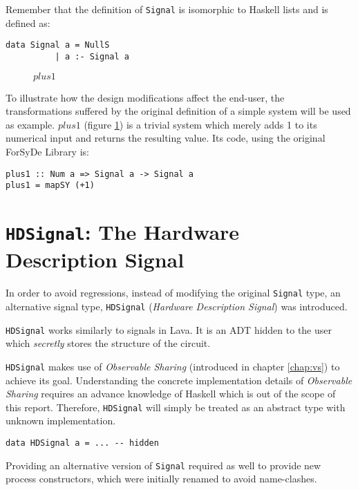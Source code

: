Remember that the definition of \texttt{Signal} is isomorphic to
Haskell lists and is defined as:

\begin{lstlisting}
data Signal a = NullS
	      | a :- Signal a 
\end{lstlisting} 


\begin{figure}
\centering

  \caption{$\mathit{plus1}$}
  \label{fig:plus1}
\end{figure}


To illustrate how the design modifications affect the end-user, the
transformations suffered by the original definition of a simple system
will be used as example. $\mathit{plus1}$ (figure \ref{fig:plus1}) is
a trivial system which merely adds 1 to its numerical input and returns
the resulting value.  Its code, using the original ForSyDe Library is:

\begin{lstlisting}
plus1 :: Num a => Signal a -> Signal a
plus1 = mapSY (+1)
\end{lstlisting}



\section{\texttt{HDSignal}: The Hardware Description Signal}
\label{sec:hdsignal}

In order to avoid regressions, instead of modifying the original
\texttt{Signal} type, an alternative signal type, \texttt{HDSignal}
(\textit{Hardware Description Signal}) was introduced.

\texttt{HDSignal} works similarly to signals in Lava. It is an ADT
hidden to the user which \textit{secretly} stores the structure of
the circuit.

\texttt{HDSignal} makes use of \textit{Observable
  Sharing} \cite{osharing} (introduced in chapter \ref{chap:vs}) to
achieve its goal. Understanding the concrete implementation details of
\textit{Observable Sharing} requires an advance knowledge of Haskell
which is out of the scope of this report. Therefore, \texttt{HDSignal}
will simply be treated as an abstract type with unknown implementation.

\begin{lstlisting}
data HDSignal a = ... -- hidden
\end{lstlisting}

Providing an alternative version of \texttt{Signal} required as well
to provide new process constructors, which were initially renamed to
avoid name-clashes.

